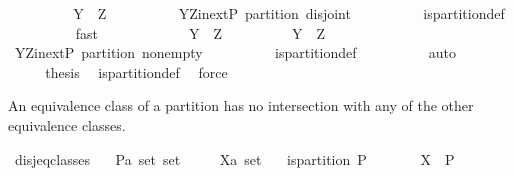 \begin{isabellebody}
\ \ \ \ \ \ \isamarkupfalse%
\ \isamarkupfalse%
\ {\isachardoublequoteopen}Y\ {\isacharequal}\ Z{\isachardoublequoteclose}\isanewline
\ \ \ \ \ \ \ \ \isamarkupfalse%
\ Y{\isacharunderscore}Z{\isacharunderscore}in{\isacharunderscore}ext{\isacharunderscore}P\ partition\ disjoint\isanewline
\ \ \ \ \ \ \ \ \isamarkupfalse%
\ is{\isacharunderscore}partition{\isacharunderscore}def\isanewline
\ \ \ \ \ \ \ \ \isamarkupfalse%
\ fast\isanewline
\ \ \ \ \isamarkupfalse%
\isanewline
\ \ \ \ \ \ \isamarkupfalse%
\ {\isachardoublequoteopen}Y\ {\isacharequal}\ Z{\isachardoublequoteclose}\isanewline
\ \ \ \ \ \ \isamarkupfalse%
\ \isamarkupfalse%
\ {\isachardoublequoteopen}Y\ {\isasyminter}\ Z\ {\isasymnoteq}\ {\isacharbraceleft}{\isacharbraceright}{\isachardoublequoteclose}\isanewline
\ \ \ \ \ \ \ \ \isamarkupfalse%
\ Y{\isacharunderscore}Z{\isacharunderscore}in{\isacharunderscore}ext{\isacharunderscore}P\ partition\ non{\isacharunderscore}empty\isanewline
\ \ \ \ \ \ \ \ \isamarkupfalse%
\ is{\isacharunderscore}partition{\isacharunderscore}def\isanewline
\ \ \ \ \ \ \ \ \isamarkupfalse%
\ auto\isanewline
\ \ \ \ \isamarkupfalse%
\isanewline
\ \ \isacommand{{\isacharbraceright}}\isamarkupfalse%
\isanewline
\ \ \isamarkupfalse%
\ \isamarkupfalse%
\ {\isacharquery}thesis\ \isamarkupfalse%
\ is{\isacharunderscore}partition{\isacharunderscore}def\ \isamarkupfalse%
\ force\isanewline
{}\isamarkupfalse%
%
\endisatagproof
{\isafoldproof}%
%
\isadelimproof
%
\endisadelimproof
%
\begin{isamarkuptext}%
An equivalence class of a partition has no intersection with any of the other 
  equivalence classes.%
\end{isamarkuptext}%
\isamarkuptrue%
\isamarkupfalse%
\ disj{\isacharunderscore}eq{\isacharunderscore}classes{\isacharcolon}\isanewline
\ \ \ P{\isacharcolon}{\isacharcolon}{\isachardoublequoteopen}{\isacharprime}a\ set\ set{\isachardoublequoteclose}\isanewline
\ \ \ \ \ X{\isacharcolon}{\isacharcolon}{\isachardoublequoteopen}{\isacharprime}a\ set{\isachardoublequoteclose}\isanewline
\ \ \ {\isachardoublequoteopen}is{\isacharunderscore}partition\ P{\isachardoublequoteclose}\isanewline
\ \ \ \ \ \ \ {\isachardoublequoteopen}X\ {\isasymin}\ P{\isachardoublequoteclose}\isanewline

\end{isabellebody}
